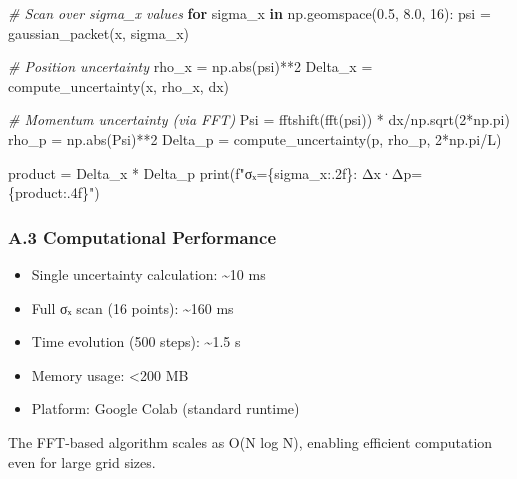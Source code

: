 \documentclass[
]{article}
\newenvironment{Shaded}{}{}
\newcommand{\BuiltInTok}[1]{\textcolor[rgb]{0.00,0.50,0.00}{#1}}
\newcommand{\CommentTok}[1]{\textcolor[rgb]{0.38,0.63,0.69}{\textit{#1}}}
\newcommand{\ControlFlowTok}[1]{\textcolor[rgb]{0.00,0.44,0.13}{\textbf{#1}}}
\newcommand{\DecValTok}[1]{\textcolor[rgb]{0.25,0.63,0.44}{#1}}
\newcommand{\FloatTok}[1]{\textcolor[rgb]{0.25,0.63,0.44}{#1}}
\newcommand{\KeywordTok}[1]{\textcolor[rgb]{0.00,0.44,0.13}{\textbf{#1}}}
\newcommand{\NormalTok}[1]{#1}
\newcommand{\OperatorTok}[1]{\textcolor[rgb]{0.40,0.40,0.40}{#1}}
\newcommand{\SpecialCharTok}[1]{\textcolor[rgb]{0.25,0.44,0.63}{#1}}
\newcommand{\SpecialStringTok}[1]{\textcolor[rgb]{0.73,0.40,0.53}{#1}}
\providecommand{\tightlist}{%
  \setlength{\itemsep}{0pt}\setlength{\parskip}{0pt}}
\begin{document}
\begin{Shaded}
\begin{Highlighting}[]
\CommentTok{\# Scan over sigma\_x values}
\ControlFlowTok{for}\NormalTok{ sigma\_x }\KeywordTok{in}\NormalTok{ np.geomspace(}\FloatTok{0.5}\NormalTok{, }\FloatTok{8.0}\NormalTok{, }\DecValTok{16}\NormalTok{):}
\NormalTok{    psi }\OperatorTok{=}\NormalTok{ gaussian\_packet(x, sigma\_x)}
    
    \CommentTok{\# Position uncertainty}
\NormalTok{    rho\_x }\OperatorTok{=}\NormalTok{ np.}\BuiltInTok{abs}\NormalTok{(psi)}\OperatorTok{**}\DecValTok{2}
\NormalTok{    Delta\_x }\OperatorTok{=}\NormalTok{ compute\_uncertainty(x, rho\_x, dx)}
    
    \CommentTok{\# Momentum uncertainty (via FFT)}
\NormalTok{    Psi }\OperatorTok{=}\NormalTok{ fftshift(fft(psi)) }\OperatorTok{*}\NormalTok{ dx}\OperatorTok{/}\NormalTok{np.sqrt(}\DecValTok{2}\OperatorTok{*}\NormalTok{np.pi)}
\NormalTok{    rho\_p }\OperatorTok{=}\NormalTok{ np.}\BuiltInTok{abs}\NormalTok{(Psi)}\OperatorTok{**}\DecValTok{2}
\NormalTok{    Delta\_p }\OperatorTok{=}\NormalTok{ compute\_uncertainty(p, rho\_p, }\DecValTok{2}\OperatorTok{*}\NormalTok{np.pi}\OperatorTok{/}\NormalTok{L)}
    
\NormalTok{    product }\OperatorTok{=}\NormalTok{ Delta\_x }\OperatorTok{*}\NormalTok{ Delta\_p}
    \BuiltInTok{print}\NormalTok{(}\SpecialStringTok{f"σₓ=}\SpecialCharTok{\{}\NormalTok{sigma\_x}\SpecialCharTok{:.2f\}}\SpecialStringTok{: Δx·Δp=}\SpecialCharTok{\{}\NormalTok{product}\SpecialCharTok{:.4f\}}\SpecialStringTok{"}\NormalTok{)}
\end{Highlighting}
\end{Shaded}

\subsubsection{A.3 Computational
Performance}\label{a.3-computational-performance}

\begin{itemize}
\tightlist
\item
  Single uncertainty calculation: \textasciitilde10 ms
\item
  Full σₓ scan (16 points): \textasciitilde160 ms
\item
  Time evolution (500 steps): \textasciitilde1.5 s
\item
  Memory usage: \textless200 MB
\item
  Platform: Google Colab (standard runtime)
\end{itemize}

The FFT-based algorithm scales as O(N log N), enabling efficient
computation even for large grid sizes.
\end{document}
